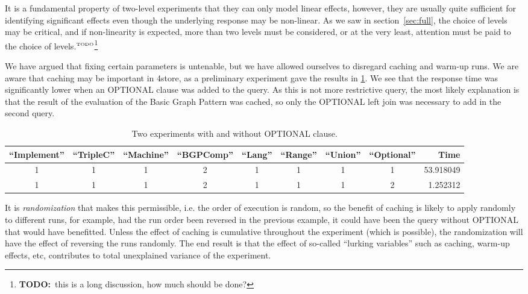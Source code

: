 \documentclass{llncs}
\newcommand{\todo}[1]{\ensuremath{^{\textrm{\tiny{TODO}\normalsize}}}\footnote{\textbf{TODO:}~#1}}
\begin{document}
It is a fundamental property of two-level experiments that they can
only model linear effects, however, they are usually quite sufficient
for identifying significant effects even though the underlying
response may be non-linear.  As we saw in section~\ref{sec:full}, the
choice of levels may be critical, and if non-linearity is expected,
more than two levels must be considered, or at the very least,
attention must be paid to the choice of levels.\todo{this is a long
  discussion, how much should be done?}

We have argued that fixing certain parameters is untenable, but we
have allowed ourselves to disregard caching and warm-up runs. We are
aware that caching may be important in 4store, as a preliminary
experiment gave the results in \ref{tab:cacheexp}. We see that the
response time was significantly lower when an OPTIONAL clause was
added to the query. As this is not more restrictive query, the most
likely explanation is that the result of the evaluation of the Basic
Graph Pattern was cached, so only the OPTIONAL left join was necessary
to add in the second query.

\begin{table}[ht]
\begin{center}
\caption{Two experiments with and without OPTIONAL clause.}\label{tab:cacheexp}
\begin{tabular}{ccccccccr}
  \hline
``Implement'' & ``TripleC'' & ``Machine'' & ``BGPComp'' & ``Lang'' & ``Range'' & ``Union'' & ``Optional'' & Time \\
 \hline
1   &    1  &     1  &     2 &   1 &    1   &  1  & 1 &  53.918049 \\
1   &    1  &     1  &     2 &   1 &    1   &  1  & 2 &   1.252312 \\
   \hline
\end{tabular}
\end{center}
\end{table}

It is \emph{randomization} that makes this permissible, i.e. the order
of execution is random, so the benefit of caching is likely to apply
randomly to different runs, for example, had the run order been
reversed in the previous example, it could have been the query without
OPTIONAL that would have benefitted. Unless the effect of caching is
cumulative throughout the experiment (which is possible), the
randomization will have the effect of reversing the runs randomly. The
end result is that the effect of so-called ``lurking variables'' such
as caching, warm-up effects, etc, contributes to total unexplained
variance of the experiment.
\end{document}
